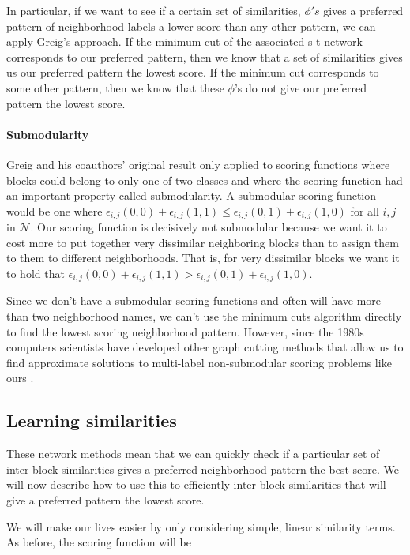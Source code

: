 In particular, if we want to see if a certain set of similarities,
$\phi's$ gives a preferred pattern of neighborhood labels a lower
score than any other pattern, we can apply Greig's approach. If the
minimum cut of the associated s-t network corresponds to our preferred
pattern, then we know that a set of similarities gives us our
preferred pattern the lowest score. If the minimum cut corresponds to
some other pattern, then we know that these $\phi$'s do not give our
preferred pattern the lowest score.

\paragraph{Submodularity}
Greig and his coauthors' original result only applied to scoring functions 
where blocks could belong to only one of two classes and where the
scoring function had an important property called submodularity.  A
submodular scoring function would be one where $\epsilon_{i,j}(0,0) +
\epsilon_{i,j}(1,1) \leq \epsilon_{i,j}(0,1) + \epsilon_{i,j}(1,0)$
for all $i,j$ in $\mathcal{N}$. Our scoring function is decisively not
submodular because we want it to cost more to put together very
dissimilar neighboring blocks than to assign them to them to different
neighborhoods. That is, for very dissimilar blocks we want it to hold
that $\epsilon_{i,j}(0,0) + \epsilon_{i,j}(1,1) \boldsymbol{>}
\epsilon_{i,j}(0,1) + \epsilon_{i,j}(1,0)$.

Since we don't have a submodular scoring functions and often will have
more than two neighborhood names, we can't use the minimum cuts
algorithm directly to find the lowest scoring neighborhood
pattern. However, since the 1980s computers scientists have developed
other graph cutting methods that allow us to find approximate
solutions to multi-label non-submodular scoring problems like ours
\cite{something}.

\subsection{Learning similarities}
These network methods mean that we can quickly check if a
particular set of inter-block similarities gives a preferred
neighborhood pattern the best score. We will now describe how to use
this to efficiently inter-block similarities that will give a
preferred pattern the lowest score.

We will make our lives easier by only considering simple, linear
similarity terms. As before, the scoring function will be


